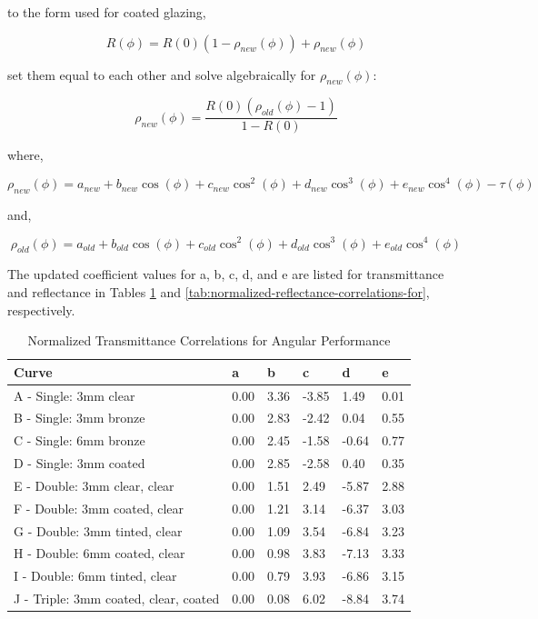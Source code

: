 to the form used for coated glazing,

\begin{equation}
  R(\phi ) = R(0)(1 - \rho_{new}(\phi )) + \rho_{new}(\phi )
\end{equation}

set them equal to each other and solve algebraically for $\rho_{new}(\phi )$:

\begin{equation}
  \rho_{new}(\phi ) = \frac{R(0)\left(\rho_{old}(\phi ) - 1\right)}{1 - R(0)}
\end{equation}

where,

\begin{equation}
  \rho_{new}(\phi ) = a_{new} + b_{new}\cos (\phi ) + c_{new}{\cos ^2}(\phi ) + d_{new}{\cos ^3}(\phi ) + e_{new}{\cos ^4}(\phi ) - \tau (\phi )
\end{equation}

and,

\begin{equation}
  \rho_{old}(\phi ) = a_{old} + b_{old}\cos (\phi ) + c_{old}{\cos ^2}(\phi ) + d_{old}{\cos ^3}(\phi ) + e_{old}{\cos ^4}(\phi )
\end{equation}

The updated coefficient values for a, b, c, d, and e are listed for transmittance and reflectance in Tables \ref{tab:normalized-transmittance-correlations-for} and \ref{tab:normalized-reflectance-correlations-for}, respectively.

\begin{table}[tbp]
  \caption{Normalized Transmittance Correlations for Angular Performance}
  \label{tab:normalized-transmittance-correlations-for}
  \centering
  \begin{tabular}{llllll}
  \hline
  Curve                                 & a    & b    & c     & d     & e    \\ \hline
  A - Single: 3mm clear                 & 0.00 & 3.36 & -3.85 & 1.49  & 0.01 \\
  B - Single: 3mm bronze                & 0.00 & 2.83 & -2.42 & 0.04  & 0.55 \\
  C - Single: 6mm bronze                & 0.00 & 2.45 & -1.58 & -0.64 & 0.77 \\
  D - Single: 3mm coated                & 0.00 & 2.85 & -2.58 & 0.40  & 0.35 \\
  E - Double: 3mm clear, clear          & 0.00 & 1.51 & 2.49  & -5.87 & 2.88 \\
  F - Double: 3mm coated, clear         & 0.00 & 1.21 & 3.14  & -6.37 & 3.03 \\
  G - Double: 3mm tinted, clear         & 0.00 & 1.09 & 3.54  & -6.84 & 3.23 \\
  H - Double: 6mm coated, clear         & 0.00 & 0.98 & 3.83  & -7.13 & 3.33 \\
  I - Double: 6mm tinted, clear         & 0.00 & 0.79 & 3.93  & -6.86 & 3.15 \\
  J - Triple: 3mm coated, clear, coated & 0.00 & 0.08 & 6.02  & -8.84 & 3.74
  \end{tabular}
\end{table}

